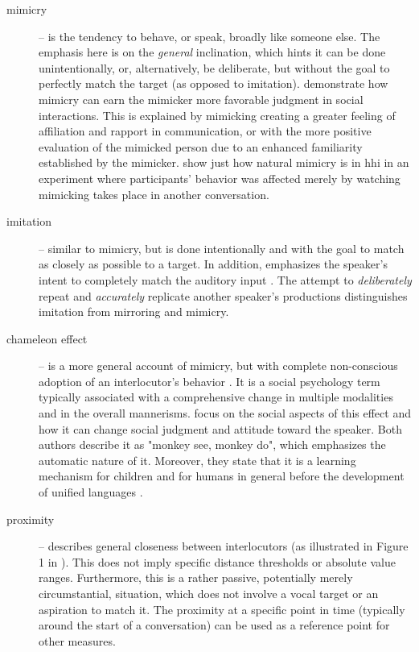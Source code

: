 \begin{description}
	\item[mimicry] -- is the tendency to behave, or speak, broadly like someone else.
	The emphasis here is on the \emph{general} inclination, which hints it can be done unintentionally, or, alternatively, be deliberate, but without the goal to perfectly match the target (as opposed to imitation).
	\citet{Gueguen2009mimicry} demonstrate how mimicry can earn the mimicker more favorable judgment in social interactions.
	This is explained by mimicking creating a greater feeling of affiliation and rapport in communication, or with the more positive evaluation of the mimicked person due to an enhanced familiarity established by the mimicker.
	\citet{Parrill2006seeing} show just how natural mimicry is in \ac{hhi} in an experiment where participants' behavior was affected merely by watching mimicking takes place in another conversation.
	
	\item[imitation] -- similar to mimicry, but is done intentionally and with the goal to match as closely as possible to a target.
	In addition, emphasizes the speaker's intent to completely match the auditory input \citep[cf.][]{Gueguen2009mimicry}.
	The attempt to \emph{deliberately} repeat and \emph{accurately} replicate another speaker's productions distinguishes imitation from mirroring and mimicry.
	
	\item[chameleon effect] -- is a more general account of mimicry, but with complete non-conscious adoption of an interlocutor's behavior \citep{Chartrand1999chameleon}.
	It is a social psychology term typically associated with a comprehensive change in multiple modalities and in the overall mannerisms.
	\citet{Gueguen2009mimicry} focus on the social aspects of this effect and how it can change social judgment and attitude toward the speaker.
	Both authors describe it as "monkey see, monkey do", which emphasizes the automatic nature of it.
	Moreover, they state that it is a learning mechanism for children and for humans in general before the development of unified languages \citet[][p.\ 256]{Gueguen2009mimicry}.
	
	\item[proximity] -- describes general closeness between interlocutors (as illustrated in Figure 1 in \citet{Levitan2011measuring}).
	This does not imply specific distance thresholds or absolute value ranges.
	Furthermore, this is a rather passive, potentially merely circumstantial, situation, which does not involve a vocal target or an aspiration to match it.
	The proximity at a specific point in time (typically around the start of a conversation) can be used as a reference point for other measures.
	

\end{description}
